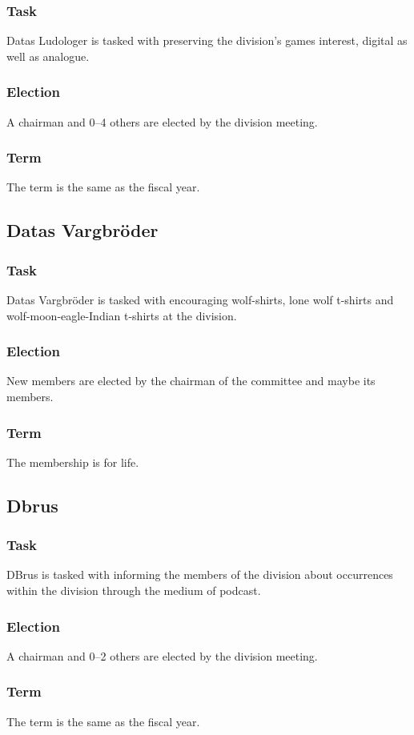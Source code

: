 \subsubsection{Task}
Datas Ludologer is tasked with preserving the division's games interest, digital as well as analogue. 
\subsubsection{Election}
A chairman and 0--4 others are elected by the division meeting. 
\subsubsection{Term}
The term is the same as the fiscal year. 

\subsection{Datas Vargbröder}
\subsubsection{Task}
Datas Vargbröder is tasked with encouraging wolf-shirts, lone wolf t-shirts and wolf-moon-eagle-Indian t-shirts at the division. 
\subsubsection{Election}
New members are elected by the chairman of the committee and maybe its members. 
\subsubsection{Term}
The membership is for life. 

\subsection{Dbrus}
\subsubsection{Task}
DBrus is tasked with informing the members of the division about occurrences within the division through the medium of podcast. 
\subsubsection{Election}
A chairman and 0--2 others are elected by the division meeting. 
\subsubsection{Term}
The term is the same as the fiscal year. 

